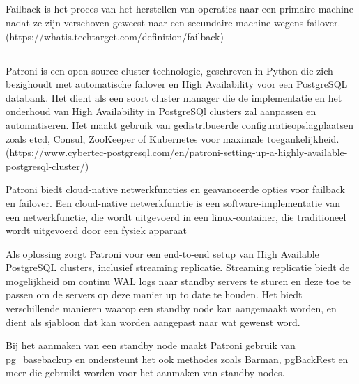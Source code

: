 \subsection{}
\label{subsec:Failback}

Failback is het proces van het herstellen van operaties naar een primaire machine  nadat ze zijn verschoven geweest naar een secundaire machine wegens failover. (https://whatis.techtarget.com/definition/failback)

\subsection{}
\label{subsec:Patroni}


Patroni is een open source cluster-technologie, geschreven in Python die zich bezighoudt met automatische failover en High Availability voor een PostgreSQL databank. Het dient als een soort cluster manager die de implementatie en het onderhoud van High Availability in PostgreSQl clusters zal aanpassen en automatiseren. Het maakt gebruik van gedistribueerde configuratieopslagplaatsen zoals etcd, Consul, ZooKeeper of Kubernetes voor maximale toegankelijkheid.
(https://www.cybertec-postgresql.com/en/patroni-setting-up-a-highly-available-postgresql-cluster/)

Patroni biedt cloud-native netwerkfuncties en geavanceerde opties voor failback en failover. Een cloud-native netwerkfunctie is een software-implementatie van een netwerkfunctie, die wordt uitgevoerd in een linux-container, die traditioneel wordt uitgevoerd door een fysiek apparaat %

Als oplossing zorgt Patroni voor een end-to-end setup van High Available PostgreSQL clusters, inclusief streaming replicatie. Streaming replicatie biedt de mogelijkheid om continu WAL logs naar standby servers te sturen en deze toe te passen om de servers op deze manier up to date te houden. %
Het biedt verschillende manieren waarop een standby node kan aangemaakt worden, en dient als sjabloon dat kan worden aangepast naar wat gewenst word.

Bij het aanmaken van een standby node maakt Patroni gebruik van pg\_basebackup en ondersteunt het ook methodes zoals Barman, pgBackRest en meer die gebruikt worden voor het aanmaken van standby nodes.

